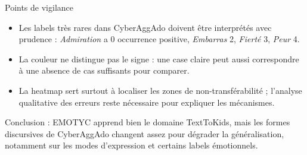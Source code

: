 \documentclass[aspectratio=169,xcolor=table]{beamer}
\begin{document}
\begin{frame}{Points de vigilance}
  \begin{itemize}
    \item Les labels tr\`es rares dans CyberAggAdo doivent \^etre interpr\'et\'es avec prudence : \textit{Admiration} a 0 occurrence positive, \textit{Embarras} 2, \textit{Fiert\'e} 3, \textit{Peur} 4.
    \item La couleur ne distingue pas le signe : une case claire peut aussi correspondre \`a une absence de cas suffisants pour comparer.
    \item La heatmap sert surtout \`a localiser les zones de non-transf\'erabilit\'e ; l'analyse qualitative des erreurs reste n\'ecessaire pour expliquer les m\'ecanismes.
  \end{itemize}

  \vspace{1em}
  \small
  Conclusion : EMOTYC apprend bien le domaine TextToKids, mais les formes discursives de CyberAggAdo changent assez pour d\'egrader la g\'en\'eralisation, notamment sur les modes d'expression et certains labels \'emotionnels.
\end{frame}
\end{document}
